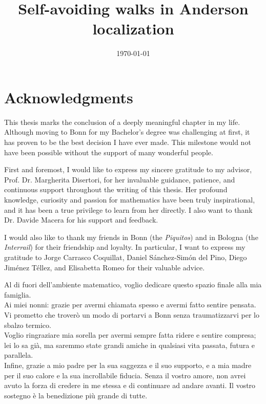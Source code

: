 \documentclass[11pt, a4paper, UKenglish, oneside]{book}
\date{\today}
\title{Self-avoiding walks in Anderson localization}
\theoremstyle{plain}
\theoremstyle{remark}
\theoremstyle{definition}
\numberwithin{equation}{section}
\numberwithin{theorem}{section}
\begin{document}
\maketitle

\clearpage
{}
\chapter*{Acknowledgments}

This thesis marks the conclusion of a deeply meaningful chapter in my life. Although moving to Bonn for my Bachelor's degree was challenging at first, it has proven to be the best decision I have ever made. This milestone would not have been possible without the support of many wonderful people.

First and foremost, I would like to express my sincere gratitude to my advisor, Prof. Dr. Margherita Disertori, for her invaluable guidance, patience, and continuous support throughout the writing of this thesis. Her profound knowledge, curiosity and passion for mathematics have been truly inspirational, and it has been a true privilege to learn from her directly. I also want to thank Dr. Davide Macera for his support and feedback.

I would also like to thank my friends in Bonn (the \textit{Piquitos}) and in Bologna (the \textit{Interrail}) for their friendship and loyalty. In particular, I want to express my gratitude to Jorge Carrasco Coquillat, Daniel Sánchez-Simón del Pino, Diego Jiménez Téllez, and Elisabetta Romeo for their valuable advice. 

Al di fuori dell'ambiente matematico, voglio dedicare questo spazio finale alla mia famiglia.\\
Ai miei nonni: grazie per avermi chiamata spesso e avermi fatto sentire pensata. Vi prometto che troverò un modo di portarvi a Bonn senza traumatizzarvi per lo sbalzo termico. \\
Voglio ringraziare mia sorella per avermi sempre fatta ridere e sentire compresa; lei lo sa già, ma saremmo state grandi amiche in qualsiasi vita passata, futura e parallela.\\
Infine, grazie a mio padre per la sua saggezza e il suo supporto, e a mia madre per il suo calore e la sua incrollabile fiducia. Senza il vostro amore, non avrei avuto la forza di credere in me stessa e di continuare ad andare avanti. Il vostro sostegno è la benedizione più grande di tutte.
\end{document}
